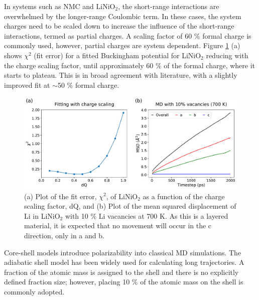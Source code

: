 \documentclass[journal=jacsat,manuscript=article]{achemso}
\begin{document}
In systems such as NMC and LiNiO$_2$, the short-range interactions are overwhelmed by the longer-range Coulombic term.
In these cases, the system charges need to be scaled down to increase the influence of the short-range interactions, termed as partial charges.
A scaling factor of 60 \% formal charge is commonly used,\cite{pedone2006potentials} however, partial charges are system dependent. 
Figure \ref{fig:LiNiO2_fitting} (a) shows $\chi^2$ (fit error) for a fitted Buckingham potential for LiNiO$_2$ reducing with the charge scaling factor, until approximately 60 \% of the formal charge, where it starts to plateau.
This is in broad agreement with literature, with a slightly improved fit at $\sim$50 \% formal charge.

\begin{figure}[h]
    \centering
    \includegraphics[scale=0.46]{Figures/LiNiO2_plots.pdf}
    \caption{\label{fig:LiNiO2_fitting} (a) Plot of the fit error, $\chi^2$, of LiNiO$_2$ as a function of the charge scaling factor, dQ, and (b) Plot of the mean squared displacement of Li in LiNiO$_2$ with 10 \% Li vacancies at 700 K. As this is a layered material, it is expected that no movement will occur in the c direction, only in a and b.}
\end{figure}

Core-shell models introduce polarizability into classical MD simulations. The adiabatic shell model\cite{Mitchell_1993} has been widely used for calculating long trajectories. 
A fraction of the atomic mass is assigned to the shell and there is no explicitly defined fraction size; however, placing 10 \% of the atomic mass on the shell is commonly adopted.\cite{PLIMPTON19951,todorov2006dl_poly_3}
\end{document}
